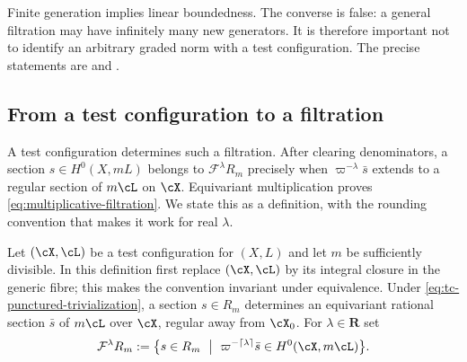 Finite generation implies linear boundedness.  The converse is false: a
general filtration may have infinitely many new generators.  It is therefore
important not to identify an arbitrary graded norm with a test
configuration.  The precise statements are
 and .

\subsection{From a test configuration to a filtration}
\label{sec:ch33-tc-to-filtration}

A test configuration determines such a filtration.  After clearing
denominators, a section $s\in H^0(X,mL)$ belongs to
$\mathcal F^\lambda R_m$ precisely when
$\varpi^{-\lambda}\bar s$ extends to a regular section of $m\cL$ on
$\cX$.  Equivariant multiplication proves
\eqref{eq:multiplicative-filtration}.  We state this as a definition, with
the rounding convention that makes it work for real $\lambda$.

\begin{definition}
\label{def:ch33-tc-filtration}
Let $(\cX,\cL)$ be a test configuration for $(X,L)$ and let $m$ be
sufficiently divisible.  In this definition first replace $(\cX,\cL)$ by
its integral closure in the generic fibre; this makes the convention
invariant under equivalence.  Under
\eqref{eq:tc-punctured-trivialization}, a section $s\in R_m$ determines an
equivariant rational section $\bar s$ of $m\cL$ over $\cX$, regular
away from $\cX_0$.  For $\lambda\in\mathbf R$ set
\begin{equation}
\label{eq:ch33-tc-filtration}
 \mathcal F^\lambda R_m
 :=\bigl\{s\in R_m\ \bigm|\
   \varpi^{-\lceil\lambda\rceil}\bar s\in
   H^0(\cX,m\cL)\bigr\}.
\end{equation}
\end{definition}


